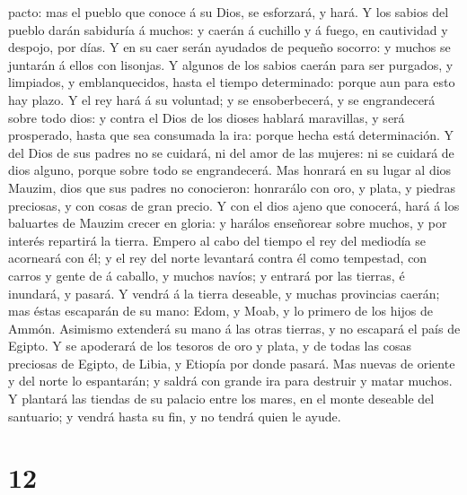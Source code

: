 pacto: mas el pueblo que conoce á su Dios, se esforzará, y hará.
 Y los sabios del pueblo darán sabiduría á muchos: y caerán
á cuchillo y á fuego, en cautividad y despojo, por días.  Y
en su caer serán ayudados de pequeño socorro: y muchos se juntarán á
ellos con lisonjas.  Y algunos de los sabios caerán para
ser purgados, y limpiados, y emblanquecidos, hasta el tiempo
determinado: porque aun para esto hay plazo.  Y el rey hará
á su voluntad; y se ensoberbecerá, y se engrandecerá sobre todo dios: y
contra el Dios de los dioses hablará maravillas, y será prosperado,
hasta que sea consumada la ira: porque hecha está determinación.
 Y del Dios de sus padres no se cuidará, ni del amor de las
mujeres: ni se cuidará de dios alguno, porque sobre todo se
engrandecerá.  Mas honrará en su lugar al dios Mauzim, dios
que sus padres no conocieron: honrarálo con oro, y plata, y piedras
preciosas, y con cosas de gran precio.  Y con el dios ajeno
que conocerá, hará á los baluartes de Mauzim crecer en gloria: y harálos
enseñorear sobre muchos, y por interés repartirá la tierra.
 Empero al cabo del tiempo el rey del mediodía se acorneará
con él; y el rey del norte levantará contra él como tempestad, con
carros y gente de á caballo, y muchos navíos; y entrará por las tierras,
é inundará, y pasará.  Y vendrá á la tierra deseable, y
muchas provincias caerán; mas éstas escaparán de su mano: Edom, y Moab,
y lo primero de los hijos de Ammón.  Asimismo extenderá su
mano á las otras tierras, y no escapará el país de Egipto. 
Y se apoderará de los tesoros de oro y plata, y de todas las cosas
preciosas de Egipto, de Libia, y Etiopía por donde pasará. 
Mas nuevas de oriente y del norte lo espantarán; y saldrá con grande ira
para destruir y matar muchos.  Y plantará las tiendas de su
palacio entre los mares, en el monte deseable del santuario; y vendrá
hasta su fin, y no tendrá quien le ayude.

\hypertarget{section-11}{%
\section{12}\label{section-11}}

